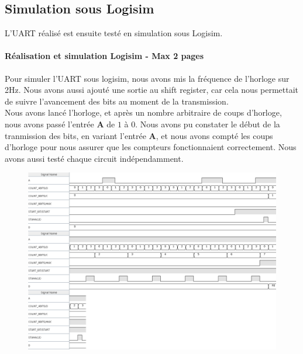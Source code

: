 \documentclass[a4paper]{article} %
\begin{document}
 \subsection{Simulation sous Logisim}
L’UART réalisé est ensuite testé en simulation sous Logisim.
\begin{tcolorbox}[colframe=Monokaimagenta,colback=white]
\paragraph{Réalisation et simulation Logisim - Max 2 pages}
Pour simuler l'UART sous logisim, nous avons mis la fréquence de l'horloge sur 2Hz. Nous avons aussi ajouté une sortie au shift register, car cela nous permettait de suivre l'avancement des bits au moment de la transmission.\\
Nous avons lancé l'horloge, et après un nombre arbitraire de coups d'horloge, nous avons passé l'entrée \textbf{A} de $1$ à $0$. Nous avons pu constater le début de la tranmission des bits, en variant l'entrée \textbf{A}, et nous avons compté les coups d'horloge pour nous assurer que les compteurs fonctionnaient correctement.
Nous avons aussi testé chaque circuit indépendamment.
\\
\begin{figure}[H]
\centering
    \includegraphics[width=1\textwidth]{src/CHRONO_UART_OK.png}

\end{figure}
\end{tcolorbox}
\end{document}
